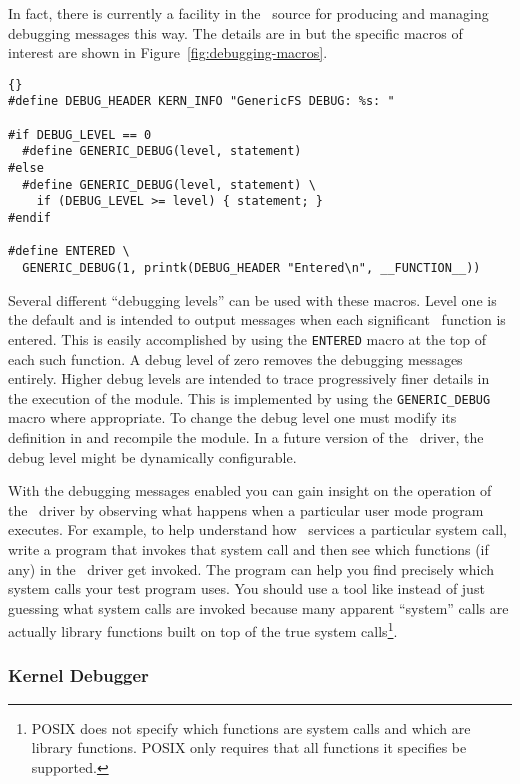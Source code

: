 In fact, there is currently a facility in the \GenericFS\ source for producing and managing
debugging messages this way. The details are in  but the specific macros of
interest are shown in Figure~\ref{fig:debugging-macros}.

\begin{figure*}[htbp]
  \centering
  \begin{wbigbox}
\begin{lstlisting}{}
#define DEBUG_HEADER KERN_INFO "GenericFS DEBUG: %s: "

#if DEBUG_LEVEL == 0
  #define GENERIC_DEBUG(level, statement)
#else
  #define GENERIC_DEBUG(level, statement) \
    if (DEBUG_LEVEL >= level) { statement; }
#endif

#define ENTERED \
  GENERIC_DEBUG(1, printk(DEBUG_HEADER "Entered\n", __FUNCTION__))
\end{lstlisting}
  \end{wbigbox}
  \caption{\GenericFS\ Debugging Macros (in )}
  \label{fig:debugging-macros}
\end{figure*}

Several different ``debugging levels'' can be used with these macros. Level one is the default
and is intended to output messages when each significant \GenericFS\ function is entered. This
is easily accomplished by using the \texttt{ENTERED} macro at the top of each such function. A
debug level of zero removes the debugging messages entirely. Higher debug levels are intended to
trace progressively finer details in the execution of the module. This is implemented by using
the \texttt{GENERIC\-\_DEBUG} macro where appropriate. To change the debug level one must modify
its definition in \filename{global.h} and recompile the module. In a future version of the
\GenericFS\ driver, the debug level might be dynamically configurable.

With the debugging messages enabled you can gain insight on the operation of the \GenericFS\
driver by observing what happens when a particular user mode program executes. For example, to
help understand how \GenericFS\ services a particular system call, write a program that invokes
that system call and then see which functions (if any) in the \GenericFS\ driver get invoked.
The program \command{strace} can help you find precisely which system calls your test program
uses. You should use a tool like \command{strace} instead of just guessing what system calls are
invoked because many apparent ``system'' calls are actually library functions built on top of
the true system calls\footnote{POSIX does not specify which functions are system calls and which
  are library functions. POSIX only requires that all functions it specifies be supported.}.

\subsubsection{Kernel Debugger}

